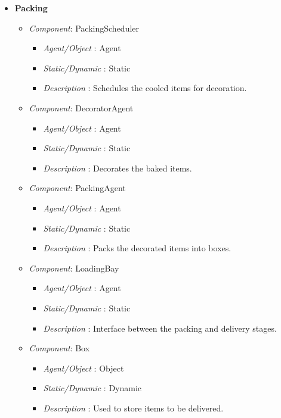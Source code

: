 \documentclass[11pt, a4paper]{article}
\begin{document}
\begin{itemize}
	\item \textbf{Packing}
	\begin{itemize}
	\item \textit{Component}: PackingScheduler
	\begin{itemize}
		\item \textit{Agent/Object} : Agent
		\item \textit{Static/Dynamic} : Static
		\item \textit{Description} : Schedules the cooled items for decoration.
	\end{itemize}
	\item \textit{Component}: DecoratorAgent
	\begin{itemize}
		\item \textit{Agent/Object} : Agent
		\item \textit{Static/Dynamic} : Static
		\item \textit{Description} : Decorates the baked items.
	\end{itemize}
	\item \textit{Component}: PackingAgent
	\begin{itemize}
		\item \textit{Agent/Object} : Agent
		\item \textit{Static/Dynamic} : Static
		\item \textit{Description} : Packs the decorated items into boxes.
	\end{itemize}
	\item \textit{Component}: LoadingBay
	\begin{itemize}
		\item \textit{Agent/Object} : Agent
		\item \textit{Static/Dynamic} : Static
		\item \textit{Description} : Interface between the packing and delivery stages.
	\end{itemize}
	\item \textit{Component}: Box
	\begin{itemize}
		\item \textit{Agent/Object} : Object
		\item \textit{Static/Dynamic} : Dynamic
		\item \textit{Description} : Used to store items to be delivered.
	\end{itemize}
	\end{itemize}


\end{itemize}
\end{document}
